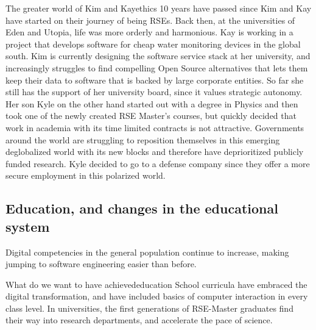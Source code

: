 \documentclass{eceasst}
\begin{document}
\begin{story}{The greater world of Kim and Kay}{ethics}
10 years have passed since Kim and Kay have started on their journey of being RSEs. Back then,
at the universities of Eden and Utopia, life was more orderly and harmonious. Kay is working in a project that develops
software for cheap water monitoring devices in the global south. Kim is currently designing the software service stack
at her university, and increasingly struggles to find compelling Open Source alternatives that lets them keep their data
to software that is backed by large corporate entities. So far she still has the support of her university board, since it values
strategic autonomy.
Her son Kyle on the other hand started out with a degree in Physics and then took one of the newly created RSE Master's courses,
but quickly decided that work in academia with its time limited contracts is not attractive.
Governments around the world are struggling to reposition themselves in this emerging deglobalized world with its new blocks
and therefore have deprioritized publicly funded research. Kyle decided to go to a defense company since they offer a
more secure employment in this polarized world.
\end{story}

\subsection{Education, and changes in the educational system}
Digital competencies in the general population continue to increase, making jumping to software engineering easier than before.

\begin{whatis}{What do we want to have achieved}{education}
School curricula have embraced the digital transformation, and have included basics of computer interaction
in every class level.
In universities, the first generations of RSE-Master graduates find their way into research departments,
and accelerate the pace of science.
\end{whatis}
\end{document}
